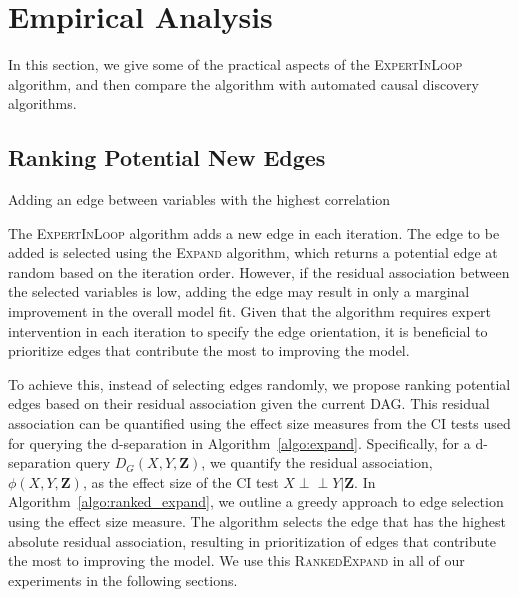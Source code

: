 \documentclass{uai2025} %
\def\ci{\perp\!\!\!\!\!\perp}
\begin{document}
\section{Empirical Analysis}
\label{sec:empirical}

In this section, we give some of the practical aspects of the
\textsc{ExpertInLoop} algorithm, and then compare the algorithm with automated
causal discovery algorithms.

\subsection{Ranking Potential New Edges}
\label{sec:ranking}

\begin{algorithm}[h]
\DontPrintSemicolon
\SetAlgoLined
{}
\caption{Adding an edge between variables with the highest correlation}
\label{algo:ranked_expand}
\end{algorithm}

The \textsc{ExpertInLoop} algorithm adds a new edge in each iteration. The edge
to be added is selected using the \textsc{Expand} algorithm, which returns a
potential edge at random based on the iteration order. However, if the residual
association between the selected variables is low, adding the edge may result
in only a marginal improvement in the overall model fit. Given that the
algorithm requires expert intervention in each iteration to specify the edge
orientation, it is beneficial to prioritize edges that contribute the most to
improving the model.

To achieve this, instead of selecting edges randomly, we propose ranking
potential edges based on their residual association given the current DAG. This
residual association can be quantified using the effect size measures from the
CI tests used for querying the d-separation in Algorithm~\ref{algo:expand}.
Specifically, for a d-separation query $ D_G(X, Y, \mathbf{Z}) $, we quantify
the residual association, $ \phi(X, Y, \bm{Z}) $, as the effect size of the CI
test $ X \ci Y \rvert \bm{Z} $. In Algorithm~\ref{algo:ranked_expand}, we
outline a greedy approach to edge selection using the effect size measure. The
algorithm selects the edge that has the highest absolute residual association,
resulting in prioritization of edges that contribute the most to improving the
model. We use this \textsc{RankedExpand} in all of our experiments in the
following sections.
\end{document}
